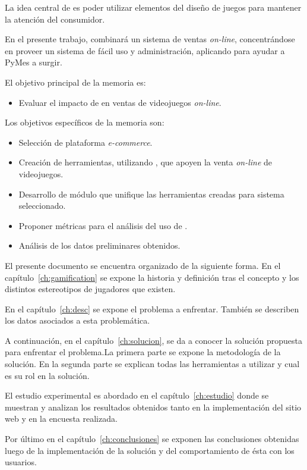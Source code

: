 La idea central de  {\gam} es poder utilizar elementos del diseño de juegos
para mantener la atención del consumidor.

En el presente trabajo, combinará un sistema de ventas \emph{on-line}, concentrándose
en proveer un sistema de fácil uso y administración, aplicando {\gam}
para ayudar a PyMes a surgir.

El objetivo principal de la memoria es:

\begin{itemize}
    \item Evaluar el impacto de {\gam} en ventas de videojuegos \emph{on-line}.
\end{itemize}

Los objetivos específicos de la memoria son:
\begin{itemize}
    \item Selección de plataforma \emph{e-commerce}.
    \item Creación de herramientas, utilizando {\gam}, que apoyen la
          venta \emph{on-line} de videojuegos.
    \item Desarrollo de módulo que unifique las herramientas creadas para sistema
          seleccionado.
    \item Proponer métricas para el análisis del uso de {\gam}.
    \item Análisis de los datos preliminares obtenidos.
\end{itemize}

El presente documento se encuentra organizado de la siguiente forma.
En el capítulo~\ref{ch:gamification} se expone la historia y definición tras
el concepto y los distintos estereotipos de jugadores que existen.

En el capítulo~\ref{ch:desc} se expone el problema a enfrentar.
También se describen los datos asociados a esta problemática.

A continuación, en el capítulo~\ref{ch:solucion}, se da a conocer la solución
propuesta para enfrentar el problema.La primera parte se expone la metodología
de la solución. En la segunda parte se explican todas las herramientas a utilizar
 y cual es su rol en la solución.

El estudio experimental es abordado en el capítulo~\ref{ch:estudio} donde
se muestran y analizan los resultados obtenidos tanto en la implementación
del sitio web y en la encuesta realizada.

Por último en el capítulo~\ref{ch:conclusiones} se exponen las conclusiones
obtenidas luego de la implementación de la solución y del comportamiento de ésta
con los usuarios.
